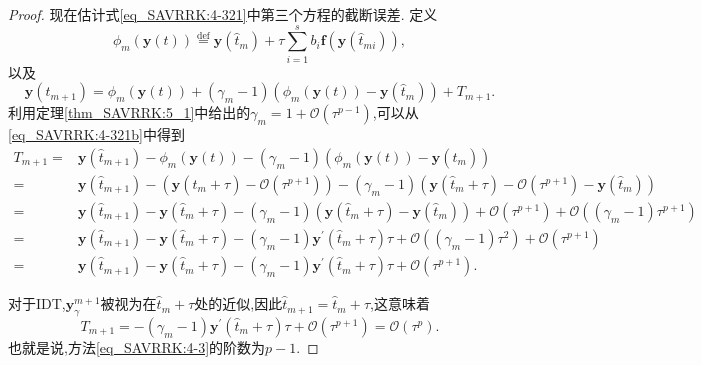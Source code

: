 \begin{proof}
现在估计式\eqref{eq_SAVRRK:4-321}中第三个方程的截断误差.
定义
$$\phi_m(\bm{y}(t))\overset{\text{def}}{=}\bm{y}\left(\hat{t}_m\right)+\tau \sum\limits_{i=1}^s b_i \bm{f}\left(\bm{y}\left(\hat{t}_{m i}\right)\right),$$
以及
\begin{equation}
\bm{y}\left(\hat{t}_{m+1}\right)=\phi_m(\bm{y}(t))+\left(\gamma_m-1\right)\left(\phi_m(\bm{y}(t))-\bm{y}\left(\hat{t}_m\right)\right)+T_{m+1}.
\end{equation}
利用定理\ref{thm_SAVRRK:5_1}中给出的$\gamma_m=1+\mathcal{O}\left(\tau^{p-1}\right)$,可以从\eqref{eq_SAVRRK:4-321b}中得到
\begin{equation}
\begin{aligned}
T_{m+1}= & \bm{y}\left(\hat{t}_{m+1}\right)\!-\!\phi_m(\bm{y}(t))\!-\!\left(\gamma_m-1\right)\left(\phi_m(\bm{y}(t))\!-\!\bm{y}\left(\hat{t}_m\right)\right) \\
= & \bm{y}\left(\hat{t}_{m+1}\right)\!-\!\left(\bm{y}\left(\hat{t}_m\!+\!\tau\right)\!-\!\mathcal{O}(\tau^{p+1})\right)\!-\!\left(\gamma_m-1\right)\left(\bm{y}\left(\hat{t}_m+\tau\right)\!-\!\mathcal{O}(\tau^{p+1})\!-\!\bm{y}\left(\hat{t}_m\right)\right) \\
= & \bm{y}\left(\hat{t}_{m+1}\right)\!-\!\bm{y}\left(\hat{t}_m\!+\!\tau\right)\!-\!\left(\gamma_m-1\right)\left(\bm{y}\left(\hat{t}_m+\tau\right)\!-\!\bm{y}\left(\hat{t}_m\right)\right)\!+\!\mathcal{O}(\tau^{p+1})\!+\!\mathcal{O}((\gamma_m-1) \tau^{p+1}) \\
= & \bm{y}\left(\hat{t}_{m+1}\right)\!-\!\bm{y}\left(\hat{t}_m\!+\!\tau\right)\!-\!\left(\gamma_m-1\right) \bm{y}^{\prime}\left(\hat{t}_m+\tau\right) \tau\!+\!\mathcal{O}((\gamma_m-1) \tau^2)\!+\!\mathcal{O}(\tau^{p+1}) \\
= & \bm{y}\left(\hat{t}_{m+1}\right)\!-\!\bm{y}\left(\hat{t}_m\!+\!\tau\right)\!-\!\left(\gamma_m-1\right) \bm{y}^{\prime}\left(\hat{t}_m+\tau\right) \tau\!+\!\mathcal{O}(\tau^{p+1}).
\end{aligned}
\end{equation}

对于IDT,$\bm{y}_\gamma^{m+1}$被视为在$\hat{t}_m+\tau$处的近似,因此$\hat{t}_{m+1}=\hat{t}_m+\tau$,这意味着
$$T_{m+1}=-\left(\gamma_m-1\right) \bm{y}^{\prime}\left(\hat{t}_m+\tau\right) \tau+\mathcal{O}\left(\tau^{p+1}\right)=\mathcal{O}\left(\tau^p\right).$$
也就是说,方法\eqref{eq_SAVRRK:4-3}的阶数为$p-1$.


\end{proof}
